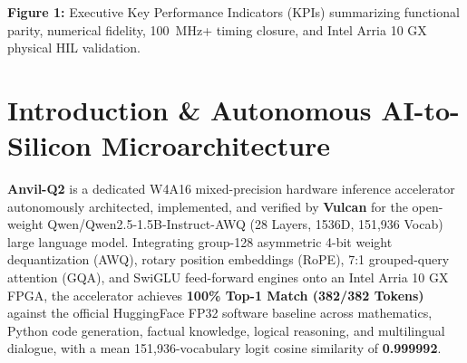 \documentclass[11pt,a4paper]{article}
\begin{document}
\begin{center}
\begin{minipage}{\textwidth}
\par\vspace{3pt}

{\small\textbf{Figure 1:} Executive Key Performance Indicators (KPIs) summarizing functional parity, numerical fidelity, 100~MHz+ timing closure, and Intel Arria 10 GX physical HIL validation.}\end{minipage}\end{center}

\section{Introduction \& Autonomous AI-to-Silicon Microarchitecture}

\textbf{Anvil-Q2} is a dedicated W4A16 mixed-precision hardware inference accelerator autonomously architected, implemented, and verified by \textbf{Vulcan} for the open-weight Qwen/\allowbreak{}Qwen2.5-1.5B-Instruct-AWQ (\allowbreak{}28 Layers,\allowbreak{} 1536D,\allowbreak{} 151,\allowbreak{}936 Vocab)\allowbreak{} large language model. Integrating group-128 asymmetric 4-bit weight dequantization (AWQ), rotary position embeddings (RoPE), 7:1 grouped-query attention (GQA), and SwiGLU feed-forward engines onto an Intel Arria 10 GX FPGA, the accelerator achieves \textbf{100\% Top-1 Match (\allowbreak{}382/\allowbreak{}382 Tokens)\allowbreak{}} against the official HuggingFace FP32 software baseline across mathematics, Python code generation, factual knowledge, logical reasoning, and multilingual dialogue, with a mean 151,936-vocabulary logit cosine similarity of \textbf{0.999992}.

\vspace{2pt}
\end{document}

